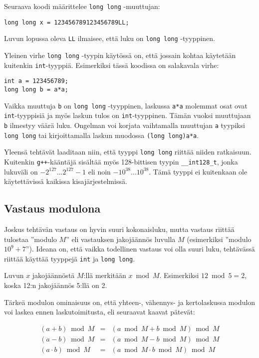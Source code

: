 Seuraava koodi määrittelee
\texttt{long long} -muuttujan:

\begin{lstlisting}
long long x = 123456789123456789LL;
\end{lstlisting}
Luvun lopussa oleva \texttt{LL}
ilmaisee, että luku on \texttt{long long} -tyyppinen.

Yleinen virhe \texttt{long long} -tyypin käytössä on,
että jossain kohtaa käytetään kuitenkin \texttt{int}-tyyppiä.
Esimerkiksi tässä koodissa on salakavala virhe:

\begin{lstlisting}
int a = 123456789;
long long b = a*a;
\end{lstlisting}

Vaikka muuttuja \texttt{b} on \texttt{long long} -tyyppinen,
laskussa \texttt{a*a} molemmat osat ovat \texttt{int}-tyyppisiä
ja myös laskun tulos on \texttt{int}-tyyppinen.
Tämän vuoksi muuttujaan \texttt{b} ilmestyy väärä luku.
Ongelman voi korjata vaihtamalla muuttujan \texttt{a}
tyypiksi \texttt{long long} tai kirjoittamalla
laskun muodossa \texttt{(long long)a*a}.

Yleensä tehtävät laaditaan niin, että tyyppi
\texttt{long long} riittää niiden ratkaisuun.
Kuitenkin \texttt{g++}-kääntäjä sisältää myös 128-bittisen
tyypin \texttt{\_\_int128\_t}, jonka lukuväli on
$-2^{127} \ldots 2^{127}-1$ eli noin $-10^{38} \ldots 10^{38}$.
Tämä tyyppi ei kuitenkaan ole käytettävissä kaikissa kisajärjestelmissä.

\subsection{Vastaus modulona}


Joskus tehtävän vastaus on hyvin suuri kokonaisluku,
mutta vastaus riittää tulostaa ''modulo $M$''
eli vastauksen jakojäännös luvulla $M$
(esimerkiksi ''modulo $10^9+7$'').
Ideana on, että vaikka todellinen vastaus
voi olla suuri luku,
tehtävässä riittää käyttää tyyppejä \texttt{int} ja \texttt{long long}.

Luvun $x$ jakojäännöstä $M$:llä
merkitään $x \bmod M$.
Esimerkiksi $12 \bmod 5 = 2$,
koska 12:n jakojäännös 5:llä on 2.

Tärkeä modulon ominaisuus on,
että yhteen-, vähennys- ja kertolaskussa
modulon voi laskea ennen laskutoimitusta,
eli seuraavat kaavat pätevät:

\[
\begin{array}{rcr}
(a+b) \bmod M & = & (a \bmod M + b \bmod M) \bmod M \\
(a-b) \bmod M & = & (a \bmod M - b \bmod M) \bmod M \\
(a \cdot b) \bmod M & = & (a \bmod M \cdot b \bmod M) \bmod M
\end{array}
\]

